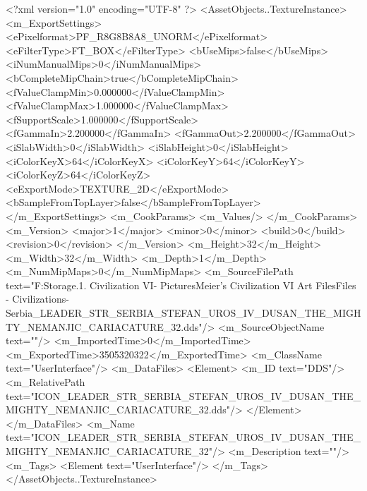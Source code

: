 <?xml version="1.0" encoding="UTF-8" ?>
<AssetObjects..TextureInstance>
	<m_ExportSettings>
		<ePixelformat>PF_R8G8B8A8_UNORM</ePixelformat>
		<eFilterType>FT_BOX</eFilterType>
		<bUseMips>false</bUseMips>
		<iNumManualMips>0</iNumManualMips>
		<bCompleteMipChain>true</bCompleteMipChain>
		<fValueClampMin>0.000000</fValueClampMin>
		<fValueClampMax>1.000000</fValueClampMax>
		<fSupportScale>1.000000</fSupportScale>
		<fGammaIn>2.200000</fGammaIn>
		<fGammaOut>2.200000</fGammaOut>
		<iSlabWidth>0</iSlabWidth>
		<iSlabHeight>0</iSlabHeight>
		<iColorKeyX>64</iColorKeyX>
		<iColorKeyY>64</iColorKeyY>
		<iColorKeyZ>64</iColorKeyZ>
		<eExportMode>TEXTURE_2D</eExportMode>
		<bSampleFromTopLayer>false</bSampleFromTopLayer>
	</m_ExportSettings>
	<m_CookParams>
		<m_Values/>
	</m_CookParams>
	<m_Version>
		<major>1</major>
		<minor>0</minor>
		<build>0</build>
		<revision>0</revision>
	</m_Version>
	<m_Height>32</m_Height>
	<m_Width>32</m_Width>
	<m_Depth>1</m_Depth>
	<m_NumMipMaps>0</m_NumMipMaps>
	<m_SourceFilePath text="F:\Mod Storage\2.1. Civilization VI\Mods\Archive - Pictures\Sid Meier's Civilization VI Art Files\Art Files - Civilizations\Civilization - Serbia\ICON_LEADER_STR_SERBIA_STEFAN_UROS_IV_DUSAN_THE_MIGHTY_NEMANJIC_CARIACATURE_32.dds"/>
	<m_SourceObjectName text=""/>
	<m_ImportedTime>0</m_ImportedTime>
	<m_ExportedTime>3505320322</m_ExportedTime>
	<m_ClassName text="UserInterface"/>
	<m_DataFiles>
		<Element>
			<m_ID text="DDS"/>
			<m_RelativePath text="ICON_LEADER_STR_SERBIA_STEFAN_UROS_IV_DUSAN_THE_MIGHTY_NEMANJIC_CARIACATURE_32.dds"/>
		</Element>
	</m_DataFiles>
	<m_Name text="ICON_LEADER_STR_SERBIA_STEFAN_UROS_IV_DUSAN_THE_MIGHTY_NEMANJIC_CARIACATURE_32"/>
	<m_Description text=""/>
	<m_Tags>
		<Element text="UserInterface"/>
	</m_Tags>
</AssetObjects..TextureInstance>

